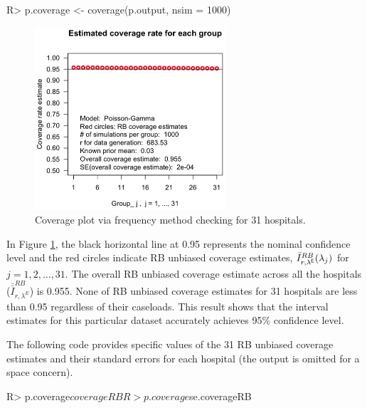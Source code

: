 \documentclass[article]{jss}
\begin{document}
\begin{CodeChunk}
\begin{CodeInput}
R> p.coverage <- coverage(p.output, nsim = 1000)
\end{CodeInput}
\end{CodeChunk}
\begin{figure}[h] 
\begin{center}
\includegraphics[width = 2.8in]{hospital2.png}
\caption{Coverage plot via frequency method checking for 31 hospitals.}
\label{fig:hospitalcoverage}
\end{center}
\end{figure}

In Figure \ref{fig:hospitalcoverage}, the black horizontal line at 0.95 represents the nominal confidence level  and the red circles indicate RB unbiased coverage estimates, $\bar{I}^{RB}_{r, \lambda^{\mathsf{E}}}(\lambda_j)$ for $j=1, 2, \ldots, 31$. The overall RB unbiased coverage estimate across all the hospitals ($\bar{\bar{I}}^{RB}_{r, \lambda^E}$) is 0.955. None of RB unbiased coverage estimates for 31 hospitals are less than 0.95 regardless of their caseloads. This result shows that the interval estimates for this particular dataset accurately achieves 95\% confidence level. 


The following code provides specific values of the 31 RB unbiased coverage estimates and their standard errors for each hospital (the output is omitted for a space concern).
\begin{CodeChunk}
\begin{CodeInput}
R> p.coverage$coverageRB
R> p.coverage$se.coverageRB
\end{CodeInput}
\end{CodeChunk}
\end{document}
